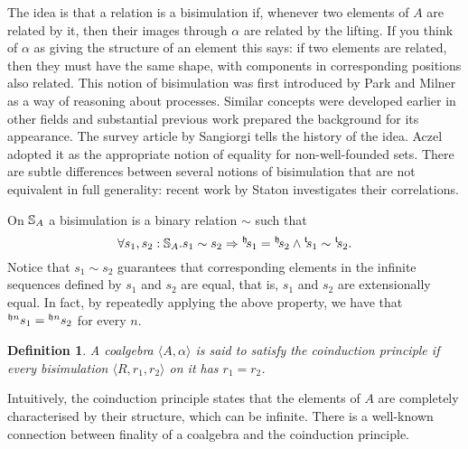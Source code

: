 \documentclass{article}
\newtheorem{definition}{Definition}
\begin{document}
The idea is that a relation is a bisimulation if, whenever two elements of $A$ are related by it, then their images through $\alpha$ are related by the lifting.
If you think of $\alpha$ as giving the structure of an element this says: if two elements are related, then they must have the same shape, with components in corresponding positions also related.
This notion of bisimulation was first introduced by Park \cite{park:1981} and Milner \cite{milner:1980} as a way of reasoning about processes.
Similar concepts were developed earlier in other fields and substantial previous work prepared the background for its appearance.
The survey article by Sangiorgi \cite{sangiorgi:2009} tells the history of the idea.  
Aczel \cite{aczel:1988} adopted it as the appropriate notion of equality for non-well-founded sets.
There are subtle differences between several notions of bisimulation that are not equivalent in full generality: recent work by Staton \cite{staton:2009} investigates their correlations.

On $\stream{A}$ a bisimulation is a binary relation $\sim$ such that
$$
\forall s_1, s_2:\stream{A}. s_1 \sim s_2 \Rightarrow
\hd{s_1} =\hd{s_2} \land
\tl{s_1}\sim \tl{s_2}.
$$
Notice that $s_1\sim s_2$ guarantees that corresponding elements in the infinite sequences defined by $s_1$ and $s_2$ are equal, that is, $s_1$ and $s_2$ are extensionally equal.
In fact, by repeatedly applying the above property, we have that $\heads{s_1}{n} = \heads{s_2}{n}$ for every $n$.

\begin{definition}\label{def:coinduction}
A coalgebra $\langle A,\alpha\rangle$ is said to satisfy the {\em coinduction principle} if every bisimulation $\langle R,r_1,r_2\rangle$ on it has $r_1=r_2$.
\end{definition}

Intuitively, the coinduction principle states that the elements of $A$ are completely characterised by their structure, which can be infinite.
There is a well-known connection between finality of a coalgebra and the coinduction principle.
\end{document}

